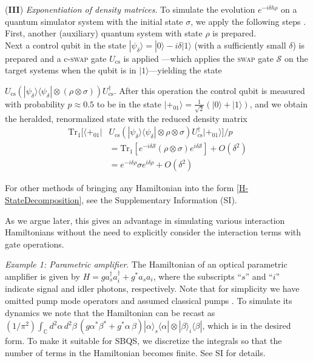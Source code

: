 \documentclass[aps,pra,twocolumn,floatfix,groupedaddress,superscriptaddress,nofootinbib,notitlepage]{revtex4-2}
\begin{document}
(\textbf{III}) \textit{Exponentiation of density matrices}. To simulate the evolution $e^{-i \delta h \rho}$ on a quantum simulator system with the initial state $\sigma$, we apply the following steps \cite{Lloyd-Mohseni-DME}. First, another (auxiliary) quantum system with state $\rho$ is prepared. \\

Next a control qubit in the state $|\psi_{\delta}\rangle = |0\rangle -i \delta |1\rangle$ (with a sufficiently small $\delta$) is prepared and a c-\textsc{swap} gate $U_{\text{cs}}$ is applied \cite{Marvian}---which applies the \textsc{swap} gate $\mathcal{S}$ on the target systems when the qubit is in $|1\rangle$---yielding the state 

$U_{\text{cs}} \left(|\psi_{\delta} \rangle\langle \psi_{\delta}| \otimes (\rho \otimes \sigma) \right) U_{\text{cs}}^{\dag}$. After this operation the control qubit is measured with probability $p \approx 0.5$ to be in the state $|+_{01}\rangle = \frac{1}{\sqrt{2}}(|0\rangle + |1\rangle)$, and we obtain the heralded, renormalized  state with the reduced density matrix 
\begin{align}
\mathrm{Tr}_{1}[\langle +_{01}| & U_{\text{cs}} \left(|\psi_{\delta} \rangle\langle \psi_{\delta}| \otimes \rho \otimes \sigma \right) U_{\text{cs}}^{\dag} |+_{01}\rangle]/p \nonumber\\ 
&= \mathrm{Tr}_{1}[e^{-i \delta \mathcal{S}}(\rho\otimes \sigma) e^{i \delta \mathcal{S}} ] + O(\delta^{2})\nonumber\\
&= e^{- i \delta \rho} \sigma e^{i \delta \rho} + O(\delta^{2})
\label{eq-ID}
\end{align}
 
For other methods of bringing any Hamiltonian into the form \eqref{H-StateDecomposition}, see the Supplementary Information (SI).

As we argue later, this gives an advantage in simulating various interaction Hamiltonians without the need to explicitly consider the interaction terms with gate operations.

\textit{Example 1: Parametric amplifier}. The Hamiltonian of an optical parametric amplifier is given by $H=g a_{s}^{\dag}a_{i}^{\dag}+g^{*} a_{s} a_{i}$, where the subscripts ``$s$'' and ``$i$'' indicate signal and idler photons, respectively. Note that for simplicity we have omitted pump mode operators and assumed classical pumps \cite{NL-crystal, IndCohwithoutIndEm}. To simulate its dynamics we note that the Hamiltonian can be recast as $(1/\pi^{2}) \textstyle{\int_{\mathds{C}}} d^{2}\alpha \, d^{2}\beta\, \left(g\alpha^{*} \beta^{*}+ g^{*}\alpha\,\beta \right)|\alpha\rangle_{s}\langle \alpha| \otimes |\beta \rangle_{i}\langle \beta|$, which is in the desired form. To make it suitable for SBQS, we discretize the integrals so that the number of terms in the Hamiltonian becomes finite. See SI for details.
 
\end{document}
